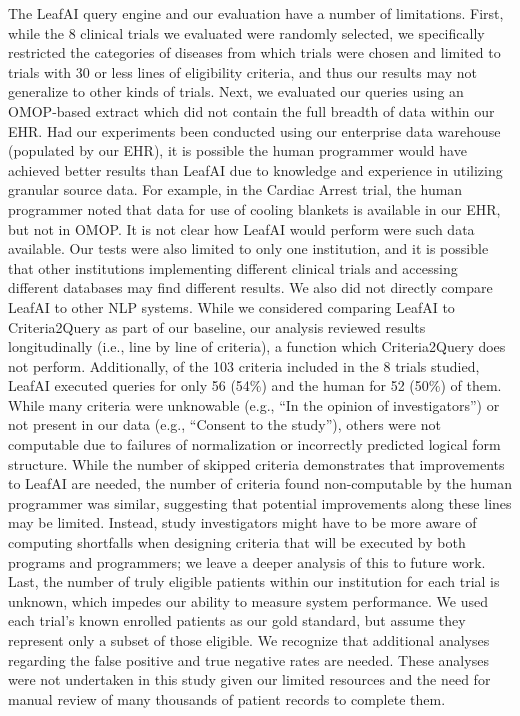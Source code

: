 \documentclass[../main.tex]{subfiles}
\begin{document}
The LeafAI query engine and our evaluation have a number of limitations. First, while the 8 clinical trials we evaluated were randomly selected, we specifically restricted the categories of diseases from which trials were chosen and limited to trials with 30 or less lines of eligibility criteria, and thus our results may not generalize to other kinds of trials. Next, we evaluated our queries using an OMOP-based extract which did not contain the full breadth of data within our EHR. Had our experiments been conducted using our enterprise data warehouse (populated by our EHR), it is possible the human programmer would have achieved better results than LeafAI due to knowledge and experience in utilizing granular source data. For example, in the Cardiac Arrest trial, the human programmer noted that data for use of cooling blankets is available in our EHR, but not in OMOP. It is not clear how LeafAI would perform were such data available. Our tests were also limited to only one institution, and it is possible that other institutions implementing different clinical trials and accessing different databases may find different results. We also did not directly compare LeafAI to other NLP systems. While we considered comparing LeafAI to Criteria2Query \cite{yuan2019criteria2query} as part of our baseline, our analysis reviewed results longitudinally (i.e., line by line of criteria), a function which Criteria2Query does not perform. Additionally, of the 103 criteria included in the 8 trials studied, LeafAI executed queries for only 56 (54\%) and the human for 52 (50\%) of them. While many criteria were unknowable (e.g., “In the opinion of investigators”) or not present in our data (e.g., “Consent to the study”), others were not computable due to failures of normalization or incorrectly predicted logical form structure. While the number of skipped criteria demonstrates that improvements to LeafAI are needed, the number of criteria found non-computable by the human programmer was similar, suggesting that potential improvements along these lines may be limited. Instead, study investigators might have to be more aware of computing shortfalls when designing criteria that will be executed by both programs and programmers; we leave a deeper analysis of this to future work. Last, the number of truly eligible patients within our institution for each trial is unknown, which impedes our ability to measure system performance. We used each trial’s known enrolled patients as our gold standard, but assume they represent only a subset of those eligible. We recognize that additional analyses regarding the false positive and true negative rates are needed. These analyses were not undertaken in this study given our limited resources and the need for manual review of many thousands of patient records to complete them.
\end{document}
